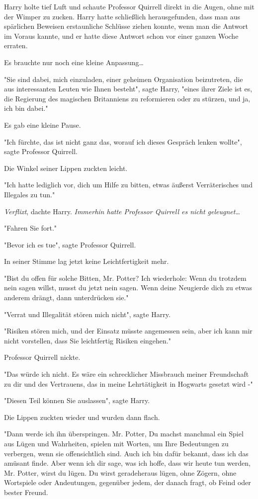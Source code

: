 {Harry holte tief Luft und schaute Professor Quirrell direkt in die Augen, ohne mit der Wimper zu zucken. Harry hatte schließlich herausgefunden, dass man aus spärlichen Beweisen erstaunliche Schlüsse ziehen konnte, wenn man die Antwort im Voraus kannte, und er hatte diese Antwort schon vor einer ganzen Woche erraten.

Es brauchte nur noch eine kleine Anpassung…

"Sie sind dabei, mich einzuladen, einer geheimen Organisation beizutreten, die aus interessanten Leuten wie Ihnen besteht", sagte Harry, "eines ihrer Ziele ist es, die Regierung des magischen Britanniens zu reformieren oder zu stürzen, und ja, ich bin dabei."

Es gab eine kleine Pause.

"Ich fürchte, das ist nicht ganz das, worauf ich dieses Gespräch lenken wollte", sagte Professor Quirrell.

Die Winkel seiner Lippen zuckten leicht.

"Ich hatte lediglich vor, dich um Hilfe zu bitten, etwas äußerst Verräterisches und Illegales zu tun."

\emph{Verflixt}, dachte Harry. \emph{Immerhin hatte Professor Quirrell es nicht geleugnet…}

"Fahren Sie fort."

"Bevor ich es tue", sagte Professor Quirrell.

In seiner Stimme lag jetzt keine Leichtfertigkeit mehr.

"Bist du offen für solche Bitten, Mr. Potter? Ich wiederhole: Wenn du trotzdem nein sagen willst, musst du jetzt nein sagen. Wenn deine Neugierde dich zu etwas anderem drängt, dann unterdrücken sie."

"Verrat und Illegalität stören mich nicht", sagte Harry.

"Risiken stören mich, und der Einsatz müsste angemessen sein, aber ich kann mir nicht vorstellen, dass Sie leichtfertig Risiken eingehen."

Professor Quirrell nickte.

"Das würde ich nicht. Es wäre ein schrecklicher Missbrauch meiner Freundschaft zu dir und des Vertrauens, das in meine Lehrtätigkeit in Hogwarts gesetzt wird -"

"Diesen Teil können Sie auslassen", sagte Harry.

Die Lippen zuckten wieder und wurden dann flach.

"Dann werde ich ihn überspringen. Mr. Potter, Du machst manchmal ein Spiel aus Lügen und Wahrheiten, spielen mit Worten, um Ihre Bedeutungen zu verbergen, wenn sie offensichtlich sind. Auch ich bin dafür bekannt, dass ich das amüsant finde. Aber wenn ich dir sage, was ich hoffe, dass wir heute tun werden, Mr. Potter, wirst du lügen. Du wirst geradeheraus lügen, ohne Zögern, ohne Wortspiele oder Andeutungen, gegenüber jedem, der danach fragt, ob Feind oder bester Freund.

}
